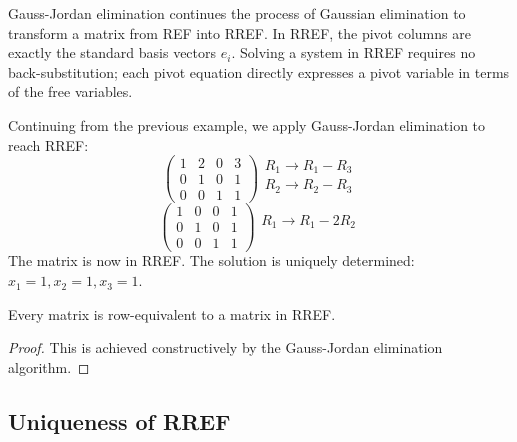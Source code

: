\documentclass[../linear_algebra_and_groups.tex]{subfiles}
\begin{document}
\begin{remark}
    Gauss-Jordan elimination continues the process of Gaussian elimination to transform a matrix from REF into RREF. In RREF, the pivot columns are exactly the standard basis vectors $e_i$. Solving a system in RREF requires no back-substitution; each pivot equation directly expresses a pivot variable in terms of the free variables.
\end{remark}

\begin{example}
    Continuing from the previous example, we apply Gauss-Jordan elimination to reach RREF:
    $$\left(\begin{array}{ccc|c} 1 & 2 & 0 & 3 \\ 0 & 1 & 0 & 1 \\ 0 & 0 & 1 & 1 \end{array}\right) \begin{matrix} R_1 \to R_1 - R_3 \\ R_2 \to R_2 - R_3 \\ \end{matrix}$$
    $$\left(\begin{array}{ccc|c} 1 & 0 & 0 & 1 \\ 0 & 1 & 0 & 1 \\ 0 & 0 & 1 & 1 \end{array}\right) \begin{matrix} R_1 \to R_1 - 2R_2 \\ \\ \end{matrix}$$
    The matrix is now in RREF. The solution is uniquely determined: $x_1=1, x_2=1, x_3=1$.
\end{example}

\begin{theorem}
    \begin{shaded*}
        Every matrix is row-equivalent to a matrix in RREF.
    \end{shaded*}
\end{theorem}
\begin{proof}
    This is achieved constructively by the Gauss-Jordan elimination algorithm.
    \qedhere
\end{proof}

\subsection{Uniqueness of RREF}
\end{document}
